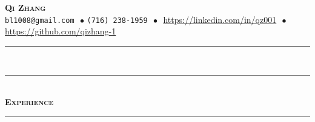 \documentclass[12pt]{article}
\begin{document}
\begin{center}
{\huge\textbf{\textsc{{Qi  Zhang}}}} \\[5pt]

\small{ \texttt{bl1008@gmail.com}  $\,\bullet\,$\texttt{(716)\,238-1959} $\,\bullet\,$  \url{https://linkedin.com/in/qz001}  $\,\bullet\,$ \url{https://github.com/qizhang-1}}
\end{center}
 \rule[0.8em]{\textwidth}{0.5pt} \\[-11pt]
 \rule[0.8em]{\textwidth}{0.5pt} \\[0pt]
\textbf{\textsc{\LARGE{Experience}}} \\ \rule[0.8em]{\textwidth}{0.5pt} \\[-20pt]
\\
\end{document}

